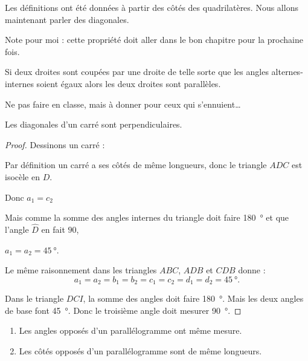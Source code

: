 Les définitions ont été données à partir des côtés des quadrilatères. Nous allons maintenant parler des diagonales.

Note pour moi : cette propriété doit aller dans le bon chapitre pour la prochaine fois.
\begin{propriete}
    Si deux droites sont coupées par une droite de telle sorte que les angles alternes-internes soient égaux alors les deux droites sont parallèles.
\end{propriete}

\begin{center}

\end{center}


Ne pas faire en classe, mais à donner pour ceux qui s'ennuient\ldots
\begin{propriete}
    Les diagonales d'un carré sont perpendiculaires.
\end{propriete}

\begin{proof}
    Dessinons un carré :
    \begin{center}
        
    \end{center}
    Par définition un carré a ses côtés de même longueurs, donc le triangle \( ADC\) est isocèle en \( D\).
    \begin{center}
        Donc \( a_1=c_2\)
    \end{center}
    Mais comme la somme des angles internes du triangle doit faire \SI{180}{\degree} et que l'angle \( \hat D\) en fait \( 90\), 
    \begin{center}
        \( a_1=a_2=\SI{45}{\degree}\).
    \end{center}
    Le même raisonnement dans les triangles \( ABC\), \( ADB\) et \( CDB\) donne :
    \begin{equation}
        a_1=a_2=b_1=b_2=c_1=c_2=d_1=d_2=\SI{45}{\degree}.
    \end{equation}
    
    Dans le triangle \( DCI\), la somme des angles doit faire \SI{180}{\degree}. Mais les deux angles de base font \SI{45}{\degree}. Donc le troisième angle doit mesurer \SI{90}{\degree}.

\end{proof}

\begin{propriete}
    \begin{enumerate}
        \item
            Les angles opposés d'un parallélogramme ont même mesure.
        \item
            Les côtés opposés d'un parallélogramme sont de même longueurs.
    \end{enumerate}
\end{propriete}

